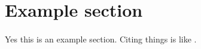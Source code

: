 \section{Example section}
\paragraph{}Yes this is an example section. Citing things is like \cite{petersen2012matrix}.
